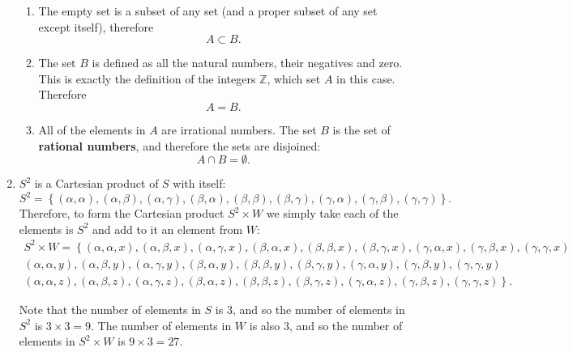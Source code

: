 \begin{enumerate}
\begin{enumerate}[label={(\roman*)}]
			\item The empty set is a subset of any set (and a proper subset of any set except itself), therefore
				\[
					A\subset B.
				\]

			\item The set $B$ is defined as all the natural numbers, their negatives and zero. This is exactly the definition of the integers $\mathbb{Z}$, which set $A$ in this case. Therefore
				\[
					A=B.
				\]

			\item All of the elements in $A$ are irrational numbers. The set $B$ is the set of \textbf{rational numbers}, and therefore the sets are disjoined:
				\[
					A\cap B = \emptyset.
				\]
		\end{enumerate}

	\item $S^{2}$ is a Cartesian product of $S$ with itself:
		\[
			S^{2} = \left\{ (\alpha,\alpha), (\alpha,\beta), (\alpha,\gamma), (\beta,\alpha), (\beta,\beta), (\beta,\gamma), (\gamma,\alpha), (\gamma,\beta), (\gamma,\gamma) \right\}.
		\]
		Therefore, to form the Cartesian product $S^{2}\times W$ we simply take each of the elements is $S^{2}$ and add to it an element from $W$:
		\begin{align*}
			S^{2}\times W =
			\left\{(\alpha,\alpha,x), (\alpha,\beta,x), (\alpha,\gamma,x), (\beta,\alpha,x), (\beta,\beta,x), (\beta,\gamma,x), (\gamma,\alpha,x), (\gamma,\beta,x), (\gamma,\gamma,x)\right.\\
			\left.(\alpha,\alpha,y), (\alpha,\beta,y), (\alpha,\gamma,y), (\beta,\alpha,y), (\beta,\beta,y), (\beta,\gamma,y), (\gamma,\alpha,y), (\gamma,\beta,y), (\gamma,\gamma,y)\right.\\
			\left.(\alpha,\alpha,z), (\alpha,\beta,z), (\alpha,\gamma,z), (\beta,\alpha,z), (\beta,\beta,z), (\beta,\gamma,z), (\gamma,\alpha,z), (\gamma,\beta,z), (\gamma,\gamma,z)\right\}.
		\end{align*}

		Note that the number of elements in $S$ is $3$, and so the number of elements in $S^{2}$ is $3\times3=9$. The number of elements in $W$ is also $3$, and so the number of elements in $S^{2}\times W$ is $9\times3=27$.


\end{enumerate}
